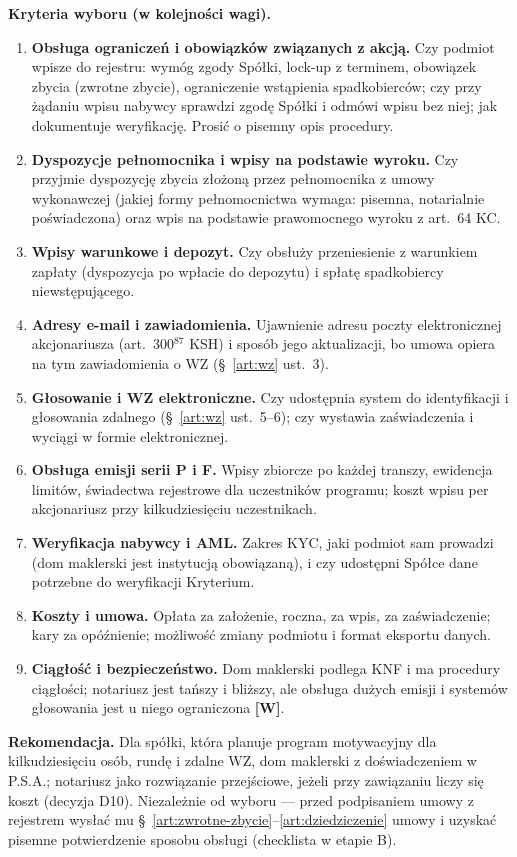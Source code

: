 \documentclass[12pt,a4paper]{report}
\newcommand{\Wiar}[1]{\textbf{[#1]}}
\begin{document}
\textbf{Kryteria wyboru (w kolejności wagi).}
\begin{enumerate}
  \item \textbf{Obsługa ograniczeń i obowiązków związanych z akcją.} Czy podmiot wpisze do rejestru: wymóg zgody Spółki, lock-up z terminem, obowiązek zbycia (zwrotne zbycie), ograniczenie wstąpienia spadkobierców; czy przy żądaniu wpisu nabywcy sprawdzi zgodę Spółki i odmówi wpisu bez niej; jak dokumentuje weryfikację. Prosić o pisemny opis procedury.
  \item \textbf{Dyspozycje pełnomocnika i wpisy na podstawie wyroku.} Czy przyjmie dyspozycję zbycia złożoną przez pełnomocnika z umowy wykonawczej (jakiej formy pełnomocnictwa wymaga: pisemna, notarialnie poświadczona) oraz wpis na podstawie prawomocnego wyroku z art.~64 KC.
  \item \textbf{Wpisy warunkowe i depozyt.} Czy obsłuży przeniesienie z warunkiem zapłaty (dyspozycja po wpłacie do depozytu) i spłatę spadkobiercy niewstępującego.
  \item \textbf{Adresy e-mail i zawiadomienia.} Ujawnienie adresu poczty elektronicznej akcjonariusza (art.~300$^{87}$ KSH) i sposób jego aktualizacji, bo umowa opiera na tym zawiadomienia o WZ (§~\ref{art:wz} ust.~3).
  \item \textbf{Głosowanie i WZ elektroniczne.} Czy udostępnia system do identyfikacji i głosowania zdalnego (§~\ref{art:wz} ust.~5--6); czy wystawia zaświadczenia i wyciągi w formie elektronicznej.
  \item \textbf{Obsługa emisji serii P i F.} Wpisy zbiorcze po każdej transzy, ewidencja limitów, świadectwa rejestrowe dla uczestników programu; koszt wpisu per akcjonariusz przy kilkudziesięciu uczestnikach.
  \item \textbf{Weryfikacja nabywcy i AML.} Zakres KYC, jaki podmiot sam prowadzi (dom maklerski jest instytucją obowiązaną), i czy udostępni Spółce dane potrzebne do weryfikacji Kryterium.
  \item \textbf{Koszty i umowa.} Opłata za założenie, roczna, za wpis, za zaświadczenie; kary za opóźnienie; możliwość zmiany podmiotu i format eksportu danych.
  \item \textbf{Ciągłość i bezpieczeństwo.} Dom maklerski podlega KNF i ma procedury ciągłości; notariusz jest tańszy i bliższy, ale obsługa dużych emisji i systemów głosowania jest u niego ograniczona \Wiar{W}.
\end{enumerate}

\textbf{Rekomendacja.} Dla spółki, która planuje program motywacyjny dla kilkudziesięciu osób, rundę i zdalne WZ, dom maklerski z doświadczeniem w P.S.A.; notariusz jako rozwiązanie przejściowe, jeżeli przy zawiązaniu liczy się koszt (decyzja D10). Niezależnie od wyboru --- przed podpisaniem umowy z rejestrem wysłać mu §~\ref{art:zwrotne-zbycie}--\ref{art:dziedziczenie} umowy i uzyskać pisemne potwierdzenie sposobu obsługi (checklista w etapie B).
\end{document}
